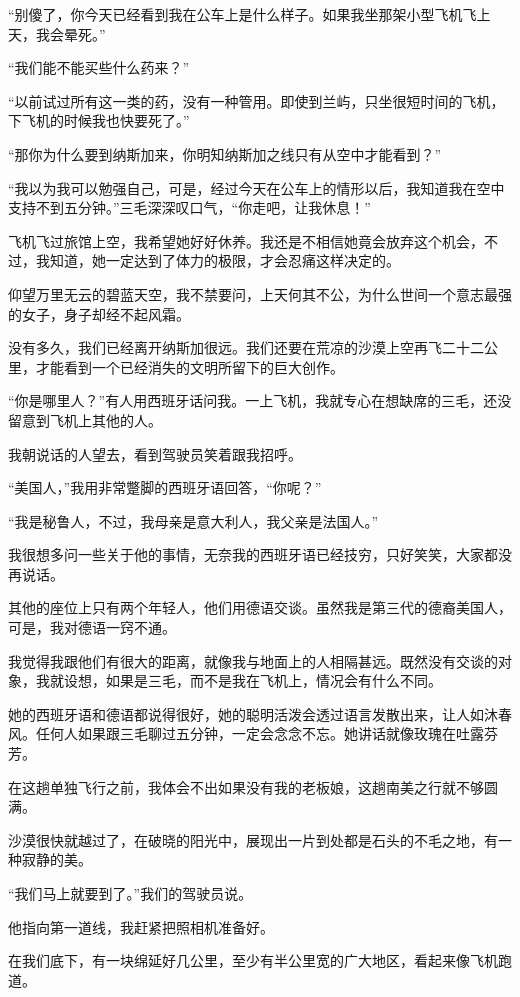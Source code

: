 \par “别傻了，你今天已经看到我在公车上是什么样子。如果我坐那架小型飞机飞上天，我会晕死。”
\par “我们能不能买些什么药来？”
\par “以前试过所有这一类的药，没有一种管用。即使到兰屿，只坐很短时间的飞机，下飞机的时候我也快要死了。”
\par “那你为什么要到纳斯加来，你明知纳斯加之线只有从空中才能看到？”
\par “我以为我可以勉强自己，可是，经过今天在公车上的情形以后，我知道我在空中支持不到五分钟。”三毛深深叹口气，“你走吧，让我休息！”
\par 飞机飞过旅馆上空，我希望她好好休养。我还是不相信她竟会放弃这个机会，不过，我知道，她一定达到了体力的极限，才会忍痛这样决定的。
\par 仰望万里无云的碧蓝天空，我不禁要问，上天何其不公，为什么世间一个意志最强的女子，身子却经不起风霜。
\par 没有多久，我们已经离开纳斯加很远。我们还要在荒凉的沙漠上空再飞二十二公里，才能看到一个已经消失的文明所留下的巨大创作。
\par “你是哪里人？”有人用西班牙话问我。一上飞机，我就专心在想缺席的三毛，还没留意到飞机上其他的人。
\par 我朝说话的人望去，看到驾驶员笑着跟我招呼。
\par “美国人，”我用非常蹩脚的西班牙语回答，“你呢？”
\par “我是秘鲁人，不过，我母亲是意大利人，我父亲是法国人。”
\par 我很想多问一些关于他的事情，无奈我的西班牙语已经技穷，只好笑笑，大家都没再说话。
\par 其他的座位上只有两个年轻人，他们用德语交谈。虽然我是第三代的德裔美国人，可是，我对德语一窍不通。
\par 我觉得我跟他们有很大的距离，就像我与地面上的人相隔甚远。既然没有交谈的对象，我就设想，如果是三毛，而不是我在飞机上，情况会有什么不同。
\par 她的西班牙语和德语都说得很好，她的聪明活泼会透过语言发散出来，让人如沐春风。任何人如果跟三毛聊过五分钟，一定会念念不忘。她讲话就像玫瑰在吐露芬芳。
\par 在这趟单独飞行之前，我体会不出如果没有我的老板娘，这趟南美之行就不够圆满。
\par 沙漠很快就越过了，在破晓的阳光中，展现出一片到处都是石头的不毛之地，有一种寂静的美。
\par “我们马上就要到了。”我们的驾驶员说。
\par 他指向第一道线，我赶紧把照相机准备好。
\par 在我们底下，有一块绵延好几公里，至少有半公里宽的广大地区，看起来像飞机跑道。
